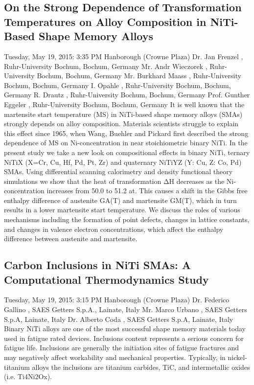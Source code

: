 \documentclass[12pt, a4paper]{article}
\begin{document}
\subsection*{On the Strong Dependence of Transformation Temperatures on Alloy Composition in NiTi-Based Shape Memory Alloys}
Tuesday, May 19, 2015: 3:35 PM
Hanborough (Crowne Plaza)
Dr. Jan Frenzel , Ruhr-University Bochum, Bochum, Germany
Mr. Andr Wieczorek , Ruhr-University Bochum, Bochum, Germany
Mr. Burkhard Maass , Ruhr-University Bochum, Bochum, Germany
I. Opahle , Ruhr-University Bochum, Bochum, Germany
R. Drautz , Ruhr-University Bochum, Bochum, Germany
Prof. Gunther Eggeler , Ruhr-University Bochum, Bochum, Germany
It is well known that the martensite start temperature (MS) in NiTi-based shape memory alloys (SMAs) strongly depends on alloy composition. Materials scientists struggle to explain this effect since 1965, when Wang, Buehler and Pickard first described the strong dependence of MS on Ni-concentration in near stoichiometric binary NiTi. In the present study we take a new look on compositional effects in binary NiTi, ternary NiTiX (X=Cr, Cu, Hf, Pd, Pt, Zr) and quaternary NiTiYZ (Y: Cu, Z: Co, Pd) SMAs. Using differential scanning calorimetry and density functional theory simulations we show that the heat of transformation ΔH decreases as the Ni-concentration increases from 50.0 to 51.2 at. This causes a shift in the Gibbs free enthalpy difference of austenite GA(T) and martensite GM(T), which in turn results in a lower martensite start temperature. We discuss the roles of various mechanisms including the formation of point defects, changes in lattice constants, and changes in valence electron concentrations, which affect the enthalpy difference between austenite and martensite.


\subsection*{Carbon Inclusions in NiTi SMAs: A Computational Thermodynamics Study}
Tuesday, May 19, 2015: 3:15 PM
Hanborough (Crowne Plaza)
Dr. Federico Gallino , SAES Getters S.p.A., Lainate, Italy
Mr. Marco Urbano , SAES Getters S.p.A, Lainate, Italy
Dr. Alberto Coda , SAES Getters S.p.A, Lainate, Italy
Binary NiTi alloys are one of the most successful shape memory materials today used in fatigue rated devices. Inclusions content represents a serious concern for fatigue life. Inclusions are generally the initiation sites of fatigue fractures and may negatively affect workability and mechanical properties. Typically, in nickel-titanium alloys the inclusions are titanium carbides, TiC, and intermetallic oxides (i.e. Ti4Ni2Ox).
\end{document}
